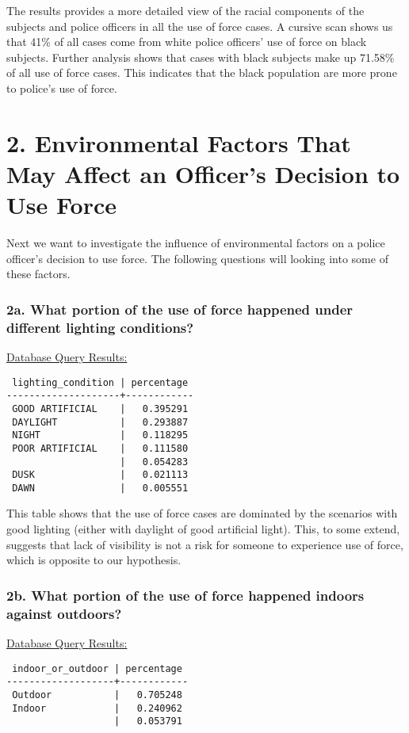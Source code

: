 \documentclass[10pt]{article}
\begin{document}
The results provides a more detailed view of the racial components of the subjects and police officers in all the use of force cases. A cursive scan shows us that 41\% of all cases come from white police officers' use of force on black subjects. Further analysis shows that cases with black subjects make up 71.58\% of all use of force cases. This indicates that the black population are more prone to police's use of force.


\section*{2. Environmental Factors That May Affect an Officer’s Decision to Use Force}

Next we want to investigate the influence of environmental factors on a police officer's decision to use force. The following questions will looking into some of these factors.

\subsubsection*{2a. What portion of the use of force happened under different lighting conditions?}

\underline{Database Query Results:}

\begin{verbatim}
 lighting_condition | percentage
--------------------+------------
 GOOD ARTIFICIAL    |   0.395291
 DAYLIGHT           |   0.293887
 NIGHT              |   0.118295
 POOR ARTIFICIAL    |   0.111580
                    |   0.054283
 DUSK               |   0.021113
 DAWN               |   0.005551
\end{verbatim}

This table shows that the use of force cases are dominated by the scenarios with good lighting (either with daylight of good artificial light). This, to some extend, suggests that lack of visibility is not a risk for someone to experience use of force, which is opposite to our hypothesis.

\subsubsection*{2b. What portion of the use of force happened indoors against outdoors?}

\underline{Database Query Results:}

\begin{verbatim}
 indoor_or_outdoor | percentage
-------------------+------------
 Outdoor           |   0.705248
 Indoor            |   0.240962
                   |   0.053791
\end{verbatim}
\end{document}
